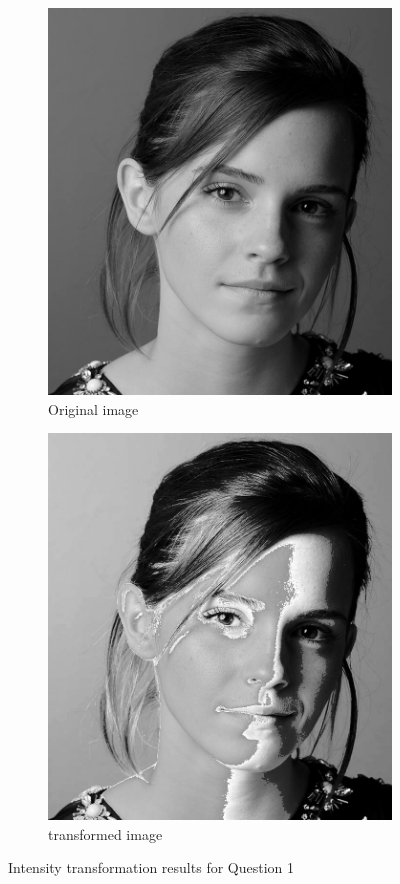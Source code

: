 \documentclass[10pt,a4paper]{article}
\begin{document}
\begin{figure}[H]
\begin{subfigure}{0.25\textwidth}
        \includegraphics[width=\textwidth]{task1/original.png}
        \caption{Original image}
    \end{subfigure}
    \begin{subfigure}{0.25\textwidth}
        \includegraphics[width=\textwidth]{task1/transformed.png}
        \caption{transformed image}
    \end{subfigure}
    \caption{Intensity transformation results for Question 1}
\end{figure}
\end{document}
